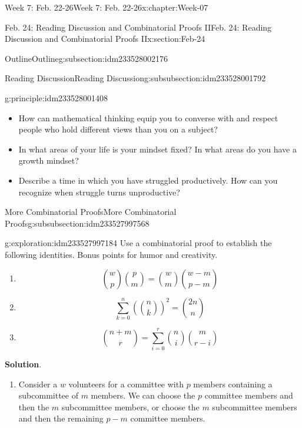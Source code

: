 \documentclass[oneside,10pt,]{book}
\newcommand{\blocktitlefont}{\relax}
\numberwithin{equation}{section}
\begin{document}
\begin{chapterptx}{Week 7: Feb. 22-26}{}{Week 7: Feb. 22-26}{}{}{x:chapter:Week-07}
\begin{sectionptx}{Feb. 24: Reading Discussion and Combinatorial Proofs II}{}{Feb. 24: Reading Discussion and Combinatorial Proofs II}{}{}{x:section:Feb-24}
\begin{subsectionptx}{Outline}{}{Outline}{}{}{g:subsection:idm233528002176}
\begin{subsubsectionptx}{Reading Discussion}{}{Reading Discussion}{}{}{g:subsubsection:idm233528001792}
\begin{principle}{}{}{g:principle:idm233528001408}
\begin{itemize}[label=\textbullet]
\item{}How can mathematical thinking equip you to converse with and respect people who hold different views than you on a subject?%
\item{}In what areas of your life is your mindset fixed? In what areas do you have a growth mindset?%
\item{}Describe a time in which you have struggled productively. How can you recognize when struggle turns unproductive?%
\end{itemize}
\end{principle}
\end{subsubsectionptx}
%
%
\typeout{************************************************}
\typeout{************************************************}
%
\begin{subsubsectionptx}{More Combinatorial Proofs}{}{More Combinatorial Proofs}{}{}{g:subsubsection:idm233527997568}
\begin{exploration}{}{g:exploration:idm233527997184}%
Use a combinatorial proof to establish the following identities. Bonus points for humor and creativity.%
%
\begin{enumerate}
\item{}%
\begin{equation*}
\binom{w}{p} \binom{p}{m} = \binom{w}{m} \binom{w-m}{p-m}
\end{equation*}
%
\item{}%
\begin{equation*}
\sum\limits_{k=0}^n \left(\binom{n}{k}\right)^2 = \binom{2n}{n}
\end{equation*}
%
\item{}%
\begin{equation*}
\binom{n+m}{r} = \sum\limits_{i=0}^r \binom{n}{i} \binom{m}{r-i}
\end{equation*}
%
\end{enumerate}
\par\smallskip%
\noindent\textbf{\blocktitlefont Solution}.\hypertarget{g:solution:idm233527993904}{}\quad{}%
\begin{enumerate}
\item{}Consider a \(w\) volunteers for a committee with \(p\) members containing a subcommittee of \(m\) members. We can choose the \(p\) committee members and then the \(m\) subcommittee members, or choose the \(m\) subcommittee members and then the remaining \(p-m\) committee members.%

\end{enumerate}
\end{exploration}
\end{subsubsectionptx}
\end{subsectionptx}
\end{sectionptx}
\end{chapterptx}
\end{document}
